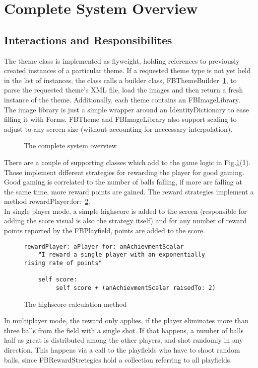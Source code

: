 \section{Complete System Overview}
%
\subsection{Interactions and Responsibilites}
The theme class is implemented as flyweight, holding references to previously 
created instances of a particular theme. If a requested theme type is not yet 
held in the list of instances, the class calls a builder class, 
FBThemeBuilder~\ref{fig:system}, to parse the requested theme's XML file, 
load the images and then return a fresh instance of the theme. Additionally, 
each theme contains an FBImageLibrary. The image library is just a simple 
wrapper around an IdentityDictionary to ease filling it with Forms. 
FBTheme and FBImageLibrary also support scaling to adjust to any screen 
size (without accounting for neccessary interpolation).
%
\begin{figure}[bt]
  \begin{center}
  \end{center}
  \caption{The complete system overview}
  \label{fig:system}
\end{figure}
%
There are a couple of supporting classes which add to the game logic 
in Fig.\ref{fig:system}(1). Those implement different strategies for 
rewarding the player for good gaming. Good gaming is correlated to the 
number of balls falling, if more are falling at the same time, more 
reward points are gained.
The reward strategies implement a method
rewardPlayer:for:~\ref{lst:reward}.\\
In single player mode, a
simple highscore is added to the screen (responsible for adding the 
score visual is also the strategy itself) and for any number of 
reward points reported by the FBPlayfield, points are added to the 
score. 
%
\begin{figure}
  \begin{center}
    \begin{lstlisting}
rewardPlayer: aPlayer for: anAchievmentScalar
    "I reward a single player with an exponentially 
rising rate of points" 

    self score:
         self score + (anAchievmentScalar raisedTo: 2)
    \end{lstlisting}
  \end{center}
  \caption{The highscore calculation method}
  \label{lst:reward}
\end{figure}
In multiplayer mode, the reward only applies, if the player eliminates 
more than three balls from the field with a single shot. If that happens, 
a number of balls half as great is distributed among the other players,
and shot randomly in any direction. This happens via a call to 
the playfields who have to shoot random balls, since FBRewardStretegies
hold a collection referring to all playfields.

